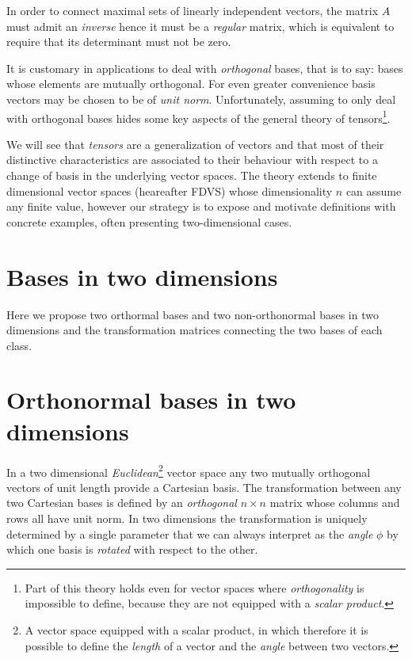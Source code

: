 In order to connect maximal sets of linearly independent vectors, the matrix $A$ must admit an \textit{inverse} hence it must be a \textit{regular} matrix, which is equivalent to require that its determinant must not be zero. 

It is customary in applications to deal with \textit{orthogonal} bases, that is to say: bases whose elements are mutually orthogonal. For even greater convenience basis vectors may be chosen to be of \textit{unit norm}. 
Unfortunately, assuming to only deal with orthogonal bases hides some key aspects of the general theory of tensors\footnote{Part of this theory holds even for vector spaces where \textit{orthogonality} is impossible to define, because they are not equipped with a \textit{scalar product}.}.   

We will see that \textit{tensors} are a generalization of vectors and that most of their distinctive characteristics are associated to their behaviour with respect to a change of basis in the underlying vector spaces. The theory extends to finite dimensional vector spaces (heareafter FDVS) whose dimensionality $n$ can assume any finite value, however our strategy is to expose and motivate definitions with concrete examples, often presenting two-dimensional cases.

\section{Bases in two dimensions}
Here we propose two orthormal bases and two non-orthonormal bases in two dimensions and the transformation matrices connecting the two bases of each class.  

\section{Orthonormal bases in two dimensions}
In a two dimensional \textit{Euclidean}\footnote{A vector space equipped with a scalar product, in which therefore it is possible to define the \textit{length} of a vector and the \textit{angle} between two vectors.} vector space any two mutually orthogonal vectors of unit length provide a Cartesian basis. The transformation between any two Cartesian bases is defined by an \textit{orthogonal} $n \times n$ matrix whose columns and rows all have unit norm. In two dimensions the transformation is uniquely determined by a single parameter that we can always interpret as the \textit{angle} $\phi$ by which one basis is \textit{rotated} with respect to the other. 

